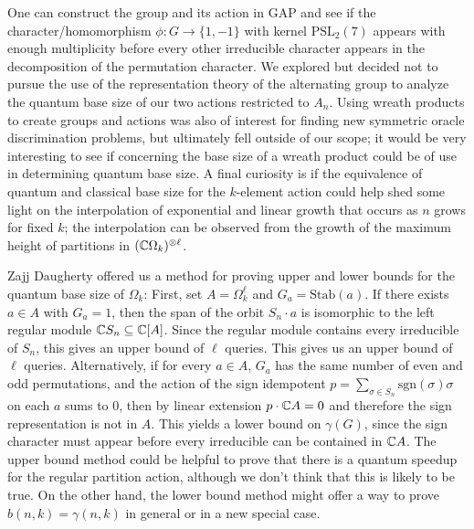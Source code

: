 \documentclass[12pt,twoside]{reedthesis}
\theoremstyle{plain}   %
\theoremstyle{definition}
\theoremstyle{remark}
\numberwithin{equation}{section}
\def\stab{\mathrm{Stab}}
\begin{document}
One can construct the group and its action in GAP and see if the character/homomorphism $\phi: G \to \{1,-1\}$ with kernel $\mathrm{PSL}_2(7)$ appears with enough multiplicity before every other
irreducible character appears in the decomposition of
the permutation character.
We explored but decided not to pursue the use of the representation theory of the alternating group to analyze the quantum base size of our two actions restricted to $A_n$.
Using wreath products to create groups and actions was also of interest for finding new symmetric oracle discrimination problems, but ultimately fell outside of our scope;
it would be very interesting to see if \cite[Theorem 1.3]{valle24} concerning the base size of a wreath product could be of use in determining quantum base size.
A final curiosity is if the equivalence of quantum and classical base size for the $k$-element action could help shed some light on the interpolation of exponential and linear growth that occurs
as $n$ grows for fixed $k$; the interpolation can be observed from the growth of the maximum height of partitions in $(\mathbb{C} \Omega_k)^{\otimes \ell}$. \par
Zajj Daugherty offered us a method for proving upper and lower bounds for the quantum base size of $\Omega_k$:
First, set \(A=\Omega_k^\ell\) and \(G_a=\stab(a)\). If there exists \(a\in A\) with \(G_a=1\), then the span of the orbit \(S_n\cdot a\) is isomorphic to the left regular module \(\mathbb{C} S_n\subseteq\mathbb{C}[A]\).
Since the regular module contains every irreducible of \(S_n\), this gives an upper bound of \(\ell\) queries.
This gives us an upper bound of $\ell$ queries.
Alternatively, if for every $a \in A$, $G_a$ has the same number of even and odd permutations, and the action of the sign idempotent $p = \sum_{\sigma \in S_n} \mathrm{sgn}(\sigma) \sigma$ on each $a$ sums to $0$,
then by linear extension $p \cdot \mathbb{C} A = 0$ and therefore the sign representation is not in $A$. This yields a lower bound on $\gamma(G)$, since the sign character must appear before every irreducible can be contained in $\mathbb{C} A$.
The upper bound method could be helpful to prove that there is a quantum speedup for the regular partition action, although we don't think that this is likely to be true.
On the other hand, the lower bound method might offer a way to prove $b(n,k) = \gamma(n,k)$ in general or in a new special case.
\end{document}
